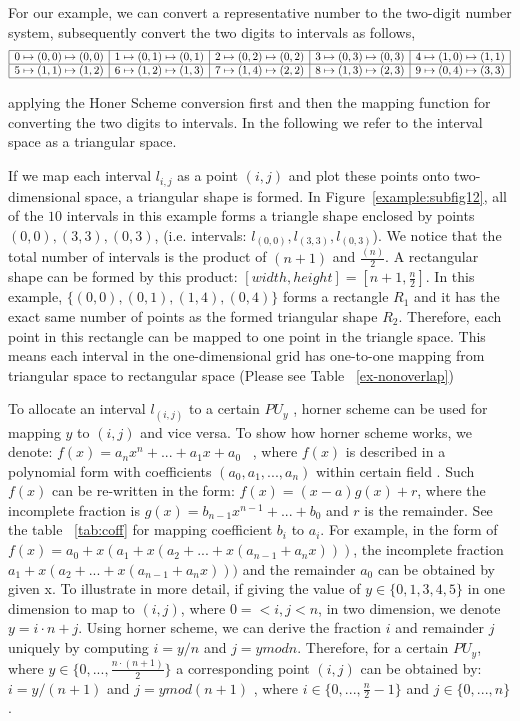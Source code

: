 \documentclass[AMA,LATO1COL]{WileyNJD-v2}
\begin{document}
For our example, we can convert a representative number to the two-digit number system, subsequently convert the two digits to intervals as follows,
\begin{equation*}
\begin{array}{|l|l|l|l|l|}
\hline
0 \mapsto (0,0)  \mapsto (0,0) &
1 \mapsto (0,1) \mapsto (0,1)  &
2 \mapsto (0,2)  \mapsto (0,2) &
3 \mapsto (0,3)  \mapsto (0,3) &
4 \mapsto (1,0) \mapsto (1,1) \\
\hline
5 \mapsto (1,1) \mapsto (1,2)&
6 \mapsto (1,2) \mapsto (1, 3)&
7 \mapsto (1,4)  \mapsto (2,2) &
8 \mapsto (1,3) \mapsto (2,3)  &
9 \mapsto (0,4)  \mapsto (3,3) \\
\hline
\end{array}
\end{equation*}

applying the Honer Scheme conversion first and then the mapping function for converting the two digits to intervals. In the following we refer to the interval space as a triangular space.

If we map each interval $l_{i,j}$ as a point $(i,j)$ and plot these points onto two-dimensional space, a triangular shape is formed. In Figure~\ref{example:subfig12}, all of the $10$ intervals in this example forms a triangle shape enclosed by points ${(0,0),(3,3),(0,3)}$, (i.e. intervals: ${l_{(0,0)},l_{(3,3)},l_{(0,3)}}$). We notice that the total number of intervals is the product of $(n+1)$ and ${\frac{(n)}{2}}$. A rectangular shape can be formed by this product: $[width,height]=[n+1,{\frac{n}{2}}]$. In this example, $\{{(0,0)},{(0,1)},{(1,4)},{(0,4)}\}$ forms a rectangle $R_1$ and it has the exact same number of points as the formed triangular shape $R_2$. Therefore, each point in this rectangle can be mapped to one point in the triangle space. This means each interval in the one-dimensional grid has one-to-one mapping from triangular space to rectangular space (Please see Table ~\ref{ex-nonoverlap})

To allocate an interval $l_{(i,j)}$ to a certain $PU_y$ , horner scheme can be used for mapping $y$ to $(i,j)$ and vice versa. To show how horner scheme works, we denote:
$f(x)= a_nx^n+ ...+ a_1x+ a_0$ ~\cite{horner}, where $f(x)$ is described in a polynomial form with coefficients $(a_0,a_1,...,a_n)$ within certain field . Such $f(x)$ can be re-written in the form: $f(x)= (x-a)g(x)+r$, where the incomplete fraction is $g(x)=b_{n-1}x^{n-1}+...+b_0$ and $r$ is the remainder. See the table ~\ref{tab:coff} for mapping coefficient $b_i$ to $a_i$. For example, in the form of $f(x)=a_0+x(a_1+x(a_2+...+x(a_{n-1}+a_nx)))$, the incomplete fraction $a_1+x(a_2+...+x(a_{n-1}+a_nx)))$ and the remainder $a_0$ can be obtained by given x. To illustrate in more detail, if giving the value of $y\in \{0,1,3,4,5\}$ in one dimension  to map to $(i,j)$, where $0=<i,j<n$, in two dimension, we denote $y=i\cdot n+j$. Using horner scheme, we can derive the fraction $i$ and remainder $j$ uniquely by computing $i=y/n$ and $j=y mod n$. Therefore, for a certain $PU_y$, where $y\in \{0,...,\frac{n \cdot (n+1)}{2}\}$  a corresponding point $(i,j)$ can be obtained by: $i= y /(n+1)$ and $j=y mod (n+1)$ , where $i\in \{0,...,\frac{n}{2}-1\}$ and $j\in\{0,...,n\} $. %
\end{document}
